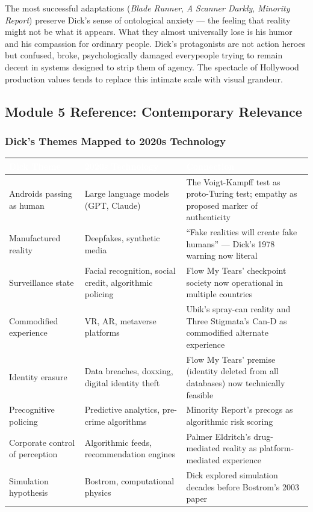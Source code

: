 \documentclass[11pt,letterpaper]{article}
\newcommand{\tableheader}[1]{\textbf{\sffamily\textcolor{white}{#1}}}
\begin{document}
The most successful adaptations (\textit{Blade Runner}, \textit{A Scanner Darkly}, \textit{Minority Report}) preserve Dick's sense of ontological anxiety --- the feeling that reality might not be what it appears. What they almost universally lose is his humor and his compassion for ordinary people. Dick's protagonists are not action heroes but confused, broke, psychologically damaged everypeople trying to remain decent in systems designed to strip them of agency. The spectacle of Hollywood production values tends to replace this intimate scale with visual grandeur.

\subsection{Module 5 Reference: Contemporary Relevance}

\subsubsection{Dick's Themes Mapped to 2020s Technology}

\begin{center}
\begin{tabularx}{\textwidth}{L{3cm}L{3cm}X}
\toprule
{}
\tableheader{Dick Theme} & \tableheader{2020s Technology} & \tableheader{Connection} \\
\midrule
Androids passing as human & Large language models (GPT, Claude) & The Voigt-Kampff test as proto-Turing test; empathy as proposed marker of authenticity \\
Manufactured reality & Deepfakes, synthetic media & ``Fake realities will create fake humans'' --- Dick's 1978 warning now literal \\
Surveillance state & Facial recognition, social credit, algorithmic policing & Flow My Tears' checkpoint society now operational in multiple countries \\
Commodified experience & VR, AR, metaverse platforms & Ubik's spray-can reality and Three Stigmata's Can-D as commodified alternate experience \\
Identity erasure & Data breaches, doxxing, digital identity theft & Flow My Tears' premise (identity deleted from all databases) now technically feasible \\
Precognitive policing & Predictive analytics, pre-crime algorithms & Minority Report's precogs as algorithmic risk scoring \\
Corporate control of perception & Algorithmic feeds, recommendation engines & Palmer Eldritch's drug-mediated reality as platform-mediated experience \\
Simulation hypothesis & Bostrom, computational physics & Dick explored simulation decades before Bostrom's 2003 paper \\
\bottomrule
\end{tabularx}
\end{center}
\end{document}
